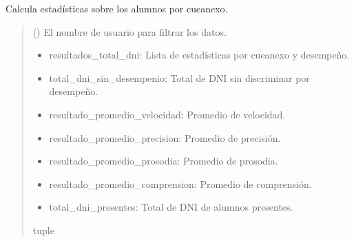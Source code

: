 \documentclass[letterpaper,10pt,spanish]{sphinxmanual}
\begin{document}
\begin{fulllineitems}

\pysigstartsignatures
{}
\pysigstopsignatures
\sphinxAtStartPar
Calcula estadísticas sobre los alumnos por cueanexo.
\begin{quote}\begin{description}
\sphinxAtStartPar
{} () \textendash{} El nombre de usuario para filtrar los datos.

\sphinxAtStartPar
\begin{description}
\begin{itemize}
\item {} 
\sphinxAtStartPar
resultados\_total\_dni: Lista de estadísticas por cueanexo y desempeño.

\item {} 
\sphinxAtStartPar
total\_dni\_sin\_desempenio: Total de DNI sin discriminar por desempeño.

\item {} 
\sphinxAtStartPar
resultado\_promedio\_velocidad: Promedio de velocidad.

\item {} 
\sphinxAtStartPar
resultado\_promedio\_precision: Promedio de precisión.

\item {} 
\sphinxAtStartPar
resultado\_promedio\_prosodia: Promedio de prosodia.

\item {} 
\sphinxAtStartPar
resultado\_promedio\_comprension: Promedio de comprensión.

\item {} 
\sphinxAtStartPar
total\_dni\_presentes: Total de DNI de alumnos presentes.

\end{itemize}

\end{description}


\sphinxAtStartPar
tuple

\end{description}\end{quote}

\end{fulllineitems}
\end{document}

